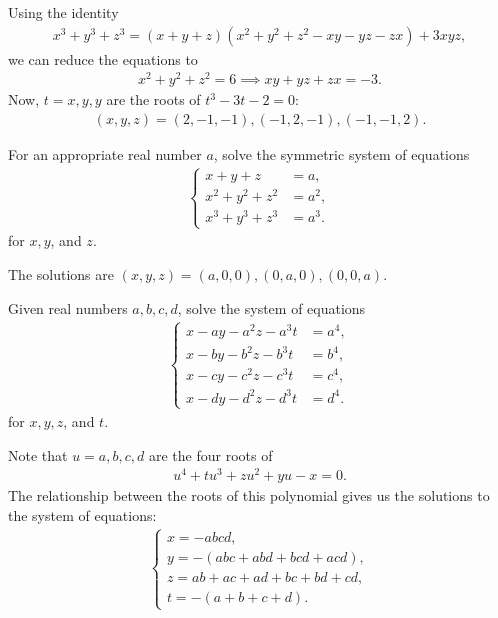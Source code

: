 \begin{solution}
    Using the identity
        \begin{align*}
            x^3+y^3+z^3=(x+y+z)(x^2+y^2+z^2-xy-yz-zx)+3xyz,
        \end{align*}
        we can reduce the equations to
        \begin{align*}
            x^2+y^2+z^2=6 \implies xy+yz+zx=-3.
        \end{align*}
        Now, $t=x,y,y$ are the roots of $t^3-3t-2=0$:
        \begin{align*}
            (x,y,z)=(2,-1,-1), (-1,2,-1), (-1,-1,2).
        \end{align*}
\end{solution}


\begin{question}\label{p:sys-eq-G}
    For an appropriate real number $a$, solve the symmetric system of equations 
    \begin{align*}
        \begin{cases}
            x+y+z &=a,\\x^2+y^2+z^2 &=a^2,\\x^3+y^3+z^3 &=a^3.
        \end{cases}
    \end{align*}
    for $x,y$, and $z$.
\end{question}


\begin{solution}
    The solutions are $(x,y,z)=(a,0,0), (0,a,0), (0,0,a)$.
\end{solution}


\begin{question}\label{p:sys-eq-H}
Given real numbers $a,b,c,d$, solve the system of equations
    \begin{align*}
        \begin{cases}
        x-ay-a^2z-a^3t &=a^4,\\x-by-b^2z-b^3t &=b^4,\\x-cy-c^2z-c^3t &=c^4,\\x-dy-d^2z-d^3t &=d^4.
    \end{cases}
    \end{align*}
for $x,y,z$, and $t$.
\end{question}

\begin{solution}
    Note that $u=a,b,c,d$ are the four roots of
        \begin{align*}
            u^4+tu^3+zu^2+yu-x=0.
        \end{align*}
        The relationship between the roots of this polynomial gives us the solutions to the system of equations:
        \begin{align*}
            \begin{cases}
                x=-abcd,\\y=-(abc+abd+bcd+acd),\\z=ab+ac+ad+bc+bd+cd,\\t=-(a+b+c+d).
            \end{cases}
        \end{align*}
\end{solution}


